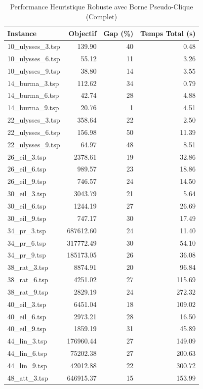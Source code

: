 \begin{table}[H]
\centering
\caption{Performance Heuristique Robuste avec Borne Pseudo-Clique (Complet)}
\small
\begin{tabular}{|l|r|r|r|}
\hline
\textbf{Instance} & \textbf{Objectif} & \textbf{Gap (\%)} & \textbf{Temps Total (s)} \\
\hline
10\_ulysses\_3.tsp & 139.90 & 40 & 0.48 \\
10\_ulysses\_6.tsp & 55.12 & 11 & 3.26 \\
10\_ulysses\_9.tsp & 38.80 & 14 & 3.55 \\
14\_burma\_3.tsp & 112.62 & 34 & 0.79 \\
14\_burma\_6.tsp & 42.74 & 28 & 4.88 \\
14\_burma\_9.tsp & 20.76 & 1 & 4.51 \\
22\_ulysses\_3.tsp & 358.64 & 22 & 2.50 \\
22\_ulysses\_6.tsp & 156.98 & 50 & 11.39 \\
22\_ulysses\_9.tsp & 64.97 & 48 & 8.51 \\
26\_eil\_3.tsp & 2378.61 & 19 & 32.86 \\
26\_eil\_6.tsp & 989.57 & 23 & 18.86 \\
26\_eil\_9.tsp & 746.57 & 24 & 14.50 \\
30\_eil\_3.tsp & 3043.79 & 21 & 5.64 \\
30\_eil\_6.tsp & 1244.19 & 27 & 26.69 \\
30\_eil\_9.tsp & 747.17 & 30 & 17.49 \\
34\_pr\_3.tsp & 687612.60 & 24 & 11.40 \\
34\_pr\_6.tsp & 317772.49 & 30 & 54.10 \\
34\_pr\_9.tsp & 185173.05 & 26 & 36.08 \\
38\_rat\_3.tsp & 8874.91 & 20 & 96.84 \\
38\_rat\_6.tsp & 4251.02 & 27 & 115.69 \\
38\_rat\_9.tsp & 2829.19 & 24 & 272.32 \\
40\_eil\_3.tsp & 6451.04 & 18 & 109.02 \\
40\_eil\_6.tsp & 2973.21 & 28 & 16.50 \\
40\_eil\_9.tsp & 1859.19 & 31 & 45.89 \\
44\_lin\_3.tsp & 176960.44 & 27 & 149.09 \\
44\_lin\_6.tsp & 75202.38 & 27 & 200.63 \\
44\_lin\_9.tsp & 42012.88 & 22 & 300.72 \\
48\_att\_3.tsp & 646915.37 & 15 & 153.99 \\

\end{tabular}
\end{table}

